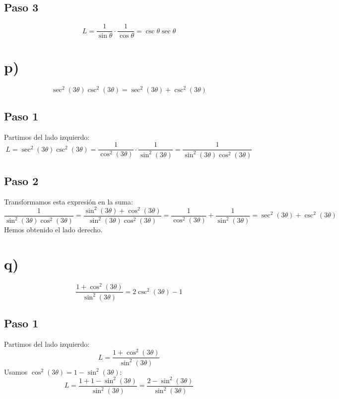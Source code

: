 \documentclass[12pt,a4paper]{article}
\begin{document}
\subsection*{Paso 3}
\[
L = \frac1{\sin\theta} \cdot \frac1{\cos\theta} = \csc\theta\sec\theta
\]

\newpage
\section*{p)}

\begin{identidad}
\[
\sec^2(3\theta)\csc^2(3\theta)
=
\sec^2(3\theta)+\csc^2(3\theta)
\]
\end{identidad}

\subsection*{Paso 1}
Partimos del lado izquierdo:
\[
L = \sec^2(3\theta)\csc^2(3\theta) = \frac{1}{\cos^2(3\theta)} \cdot \frac{1}{\sin^2(3\theta)}
= \frac{1}{\sin^2(3\theta)\cos^2(3\theta)}
\]

\subsection*{Paso 2}
Transformamos esta expresión en la suma:
\[
\frac{1}{\sin^2(3\theta)\cos^2(3\theta)}
= \frac{\sin^2(3\theta)+\cos^2(3\theta)}{\sin^2(3\theta)\cos^2(3\theta)}
= \frac{1}{\cos^2(3\theta)} + \frac{1}{\sin^2(3\theta)}
= \sec^2(3\theta) + \csc^2(3\theta)
\]
Hemos obtenido el lado derecho.

\newpage
\section*{q)}

\begin{identidad}
\[
\frac{1+\cos^2(3\theta)}
{\sin^2(3\theta)}
=
2\csc^2(3\theta)-1
\]
\end{identidad}

\subsection*{Paso 1}
Partimos del lado izquierdo:
\[
L = \frac{1+\cos^2(3\theta)}{\sin^2(3\theta)}
\]
Usamos \(\cos^2(3\theta) = 1 - \sin^2(3\theta)\):
\[
L = \frac{1 + 1 - \sin^2(3\theta)}{\sin^2(3\theta)}
= \frac{2 - \sin^2(3\theta)}{\sin^2(3\theta)}
\]
\end{document}
